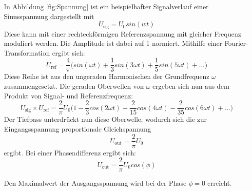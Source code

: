 In Abbildung \ref{fig:Spannung} ist ein beispielhafter Signalverlauf einer Sinusspannung dargestellt mit
\begin{equation}
	U_\text{sig} = U_0sin(wt)
\end{equation}
Diese kann mit einer rechteckförmigen Referenzspannung mit gleicher Frequenz moduliert werden. Die Amplitude ist dabei auf 1 normiert.
Mithilfe einer Fourier-Transformation ergibt sich:
\begin{equation}
	U_\text{ref} = \frac{4}{\pi} \biggl(sin(\omega t) + \frac{1}{3}sin(3\omega t) + \frac{1}{5}sin(5\omega t) + ... \biggr)
\end{equation}
 Diese Reihe ist aus den ungeraden Harmonischen der Grundfrequenz $\omega$ zusammengesetzt.
 Die geraden Oberwellen von $\omega$ ergeben sich nun aus dem Produkt von Signal- und Referenzfrequenz:
 \begin{equation}
 	U_\text{sig} \times U_\text{ref} = \frac{2}{\pi}U_0\biggl(1-\frac{2}{3}cos(2\omega t)-\frac{2}{15}cos(4\omega t)-\frac{2}{35}cos(6\omega t)+...\biggr)
\end{equation}
Der Tiefpass unterdrückt nun diese Oberwelle, wodurch sich die zur Eingangsspannung proportionale Gleichspannung
\begin{equation}
	U_\text{out} = \frac{2}{\pi}U_0
\end{equation}
ergibt. Bei einer Phasendifferenz ergibt sich:
 \begin{equation}
  	U_\text{out}=\frac{2}{\pi}U_0cos(\phi)
\end{equation}

Den Maximalwert der Ausgangsspannung wird bei der Phase $\phi = 0$ erreicht.
